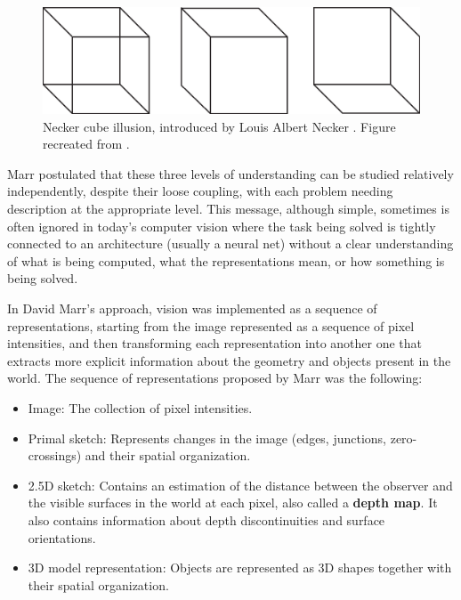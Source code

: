 \begin{figure}[t]
\centerline{
\includegraphics[width=.9\linewidth]{figures/taxonomy/necker.eps}
} 
\caption{Necker cube illusion, introduced by Louis Albert Necker \cite{Necker1832}. Figure recreated from \cite{Marr82}.} 
\label{fig:necker_cube}
\end{figure}


Marr postulated that these three levels of understanding can be studied relatively independently, despite their loose coupling, with
each problem needing description at the appropriate level. This message, although simple, sometimes is often ignored in today’s computer vision where the task being solved is tightly connected to an architecture (usually a neural net) without a clear understanding of what is being computed, what the representations mean, or how something is being solved. 


In David Marr’s approach, vision was implemented as a sequence of representations, starting from the image represented as a sequence of pixel intensities, and then transforming each representation into another one that extracts more explicit information about the geometry and objects present in the world. The sequence of representations proposed by Marr was the following:

\begin{itemize}
\item Image: The collection of pixel intensities. 
\item Primal sketch: Represents changes in the image (edges, junctions, zero-crossings) and their spatial organization.
\item 2.5D sketch: Contains an estimation of the distance between the observer and the visible surfaces in the world at each pixel, also called a {\bf depth map}. It also contains information about depth discontinuities and surface orientations. 
\item 3D model representation: Objects are represented as 3D shapes together with their spatial organization. 
\end{itemize}


